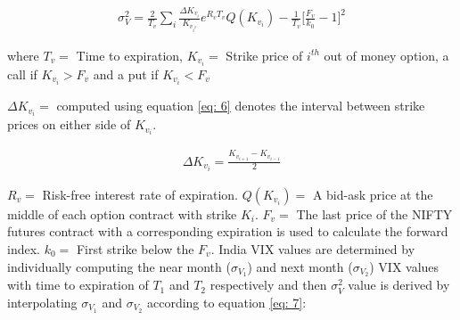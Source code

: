 \documentclass[conference]{IEEEtran}
\begin{document}
\begin{align}
    \sigma^{2}_{V} = \frac{2}{T_{v}} \sum_{i}\frac{\Delta  K_{v_{i}}}{K_{v_{i^{2}}}}e^{{R_{v}T_{v}}}Q(K_{v_{i}}) - \frac{1}{T_{v}}\Big[\frac{F_{v}}{k_{0}} - 1\Big]^2 \label{eq: 5}
\end{align}

\noindent where $T_{v} =$ Time to expiration, $K_{v_{i}} = $ Strike price of $i^{th}$ out of money option, a call if $K_{v_{i}} > F_{v}$ and a put if $K_{v_{i}} < F_{v}$

\noindent $\Delta K_{v_{i}} =$ computed using equation \eqref{eq: 6} denotes the interval between strike prices on either side of $K_{v_{i}}$.
    
\begin{align}
    \Delta K_{v_{i}} = \frac{K_{v_{i + 1}} - K_{v_{i - 1}}}{2} \label{eq: 6}
\end{align}
    

\noindent $R_{v} =$ Risk-free interest rate of expiration.
$Q(K_{v_{i}}) =$ A bid-ask price at the middle of each option contract with strike $K_{i}$. \newline
$F_{v} =$ The last price of the NIFTY futures contract with a corresponding expiration is used to calculate the forward index. $k_{0} =$ First strike below the $F_{v}$. \newline
India VIX values are determined by individually computing the near month ($\sigma_{V_{1}}$) and next month ($\sigma_{V_{2}}$) VIX values with time to expiration of $T_{1}$ and $T_{2}$ respectively and then ${\sigma^{2}_{V}}$ value is derived by interpolating $\sigma_{V_{1}}$ and $\sigma_{V_{2}}$ according to equation \eqref{eq: 7}:
\end{document}
